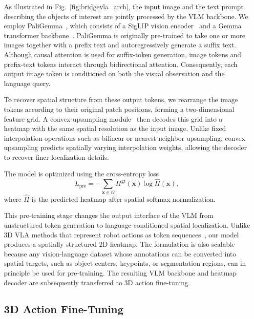 As illustrated in Fig.~\ref{fig:bridgevla_arch}, the input image and the
text prompt describing the objects of interest are jointly processed by the
VLM backbone.
We employ PaliGemma~\cite{beyer2024paligemma}, which consists of a SigLIP
vision encoder~\cite{zhai2023sigmoid} and a Gemma transformer
backbone~\cite{team2024gemma}.
PaliGemma is originally pre-trained to take one or more images together with
a prefix text and autoregressively generate a suffix text.
Although causal attention is used for suffix-token generation, image tokens
and prefix-text tokens interact through bidirectional attention.
Consequently, each output image token is conditioned on both the visual
observation and the language query.

To recover spatial structure from these output tokens, we rearrange the
image tokens according to their original patch positions, forming a
two-dimensional feature grid.
A convex-upsampling module~\cite{teed2020raft} then decodes this grid into a
heatmap with the same spatial resolution as the input image.
Unlike fixed interpolation operations such as bilinear or nearest-neighbor
upsampling, convex upsampling predicts spatially varying interpolation
weights, allowing the decoder to recover finer localization details.

The model is optimized using the cross-entropy loss
\begin{equation}
L_{\mathrm{pre}}
=
-\sum_{\mathbf{x}\in\Omega}
H^{\mathrm{gt}}(\mathbf{x})
\log
\widehat{H}(\mathbf{x}),
\label{eq:pretrain_heatmap_loss}
\end{equation}
where $\widehat{H}$ is the predicted heatmap after spatial softmax
normalization.

This pre-training stage changes the output interface of the VLM from
unstructured token generation to language-conditioned spatial localization.
Unlike 3D VLA methods that represent robot actions as token
sequences~\cite{zhen20243d,qu2025spatialvla}, our model produces a
spatially structured 2D heatmap.
The formulation is also scalable because any vision-language dataset whose
annotations can be converted into spatial targets, such as object centers,
keypoints, or segmentation regions, can in principle be used for
pre-training.
The resulting VLM backbone and heatmap decoder are subsequently transferred
to 3D action fine-tuning.


\subsection{3D Action Fine-Tuning}
\label{sec:bridgevla:finetune}

